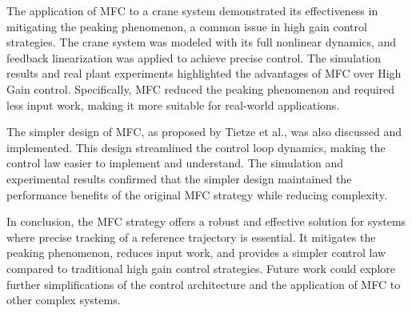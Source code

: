 The application of MFC to a crane system demonstrated its effectiveness in 
mitigating the peaking phenomenon, a common issue in high gain control 
strategies. The crane system was modeled with its full nonlinear dynamics, 
and feedback linearization was applied to achieve precise control. The 
simulation results and real plant experiments highlighted the advantages 
of MFC over High Gain control. Specifically, MFC reduced the peaking 
phenomenon and required less input work, making it more suitable for 
real-world applications.

The simpler design of MFC, as proposed by Tietze et al., was also discussed 
and implemented. This design streamlined the control loop dynamics, making 
the control law easier to implement and understand. The simulation and 
experimental results confirmed that the simpler design maintained the 
performance benefits of the original MFC strategy while reducing complexity.

In conclusion, the MFC strategy offers a robust and effective solution 
for systems where precise tracking of a reference trajectory is essential. 
It mitigates the peaking phenomenon, reduces input work, and provides a 
simpler control law compared to traditional high gain control strategies. 
Future work could explore further simplifications of the control architecture 
and the application of MFC to other complex systems.

\newpage
